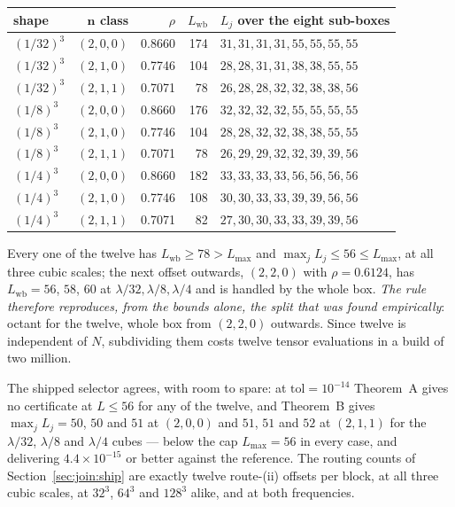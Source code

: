 \begin{center}\footnotesize
\begin{tabular}{@{}lrrrl@{}}
\toprule
shape & $\mathbf{n}$ class & $\rho$ & $L_{\mathrm{wb}}$ & $L_j$ over the eight sub-boxes\\
\midrule
$(1/32)^3$ & $(2,0,0)$ & 0.8660 & 174 & $31,31,31,31,55,55,55,55$\\
$(1/32)^3$ & $(2,1,0)$ & 0.7746 & 104 & $28,28,31,31,38,38,55,55$\\
$(1/32)^3$ & $(2,1,1)$ & 0.7071 & 78  & $26,28,28,32,32,38,38,56$\\
$(1/8)^3$  & $(2,0,0)$ & 0.8660 & 176 & $32,32,32,32,55,55,55,55$\\
$(1/8)^3$  & $(2,1,0)$ & 0.7746 & 104 & $28,28,32,32,38,38,55,55$\\
$(1/8)^3$  & $(2,1,1)$ & 0.7071 & 78  & $26,29,29,32,32,39,39,56$\\
$(1/4)^3$  & $(2,0,0)$ & 0.8660 & 182 & $33,33,33,33,56,56,56,56$\\
$(1/4)^3$  & $(2,1,0)$ & 0.7746 & 108 & $30,30,33,33,39,39,56,56$\\
$(1/4)^3$  & $(2,1,1)$ & 0.7071 & 82  & $27,30,30,33,33,39,39,56$\\
\bottomrule
\end{tabular}
\end{center}

\noindent
Every one of the twelve has $L_{\mathrm{wb}} \ge 78 > L_{\max}$ and
$\max_j L_j \le 56 \le L_{\max}$, at all three cubic scales; the next offset outwards,
$(2,2,0)$ with $\rho = 0.6124$, has $L_{\mathrm{wb}} = 56$, $58$, $60$ at
$\lambda/32, \lambda/8, \lambda/4$ and is handled by the whole box. \emph{The rule
therefore reproduces, from the bounds alone, the split that was found empirically}:
octant for the twelve, whole box from $(2,2,0)$ outwards. Since twelve is independent of
$N$, subdividing them costs twelve tensor evaluations in a build of two million.

The shipped selector agrees, with room to spare: at $\mathrm{tol} = 10^{-14}$ Theorem~A
gives no certificate at $L \le 56$ for any of the twelve, and Theorem~B gives
$\max_j L_j = 50$, $50$ and $51$ at $(2,0,0)$ and $51$, $51$ and $52$ at $(2,1,1)$ for the
$\lambda/32$, $\lambda/8$ and $\lambda/4$ cubes --- below the cap $L_{\max} = 56$ in
every case, and delivering $4.4\times10^{-15}$ or better against the reference.
The routing counts of Section~\ref{sec:join:ship} are exactly twelve route-(ii) offsets per
block, at all three cubic scales, at $32^3$, $64^3$ and $128^3$ alike, and at both
frequencies.


